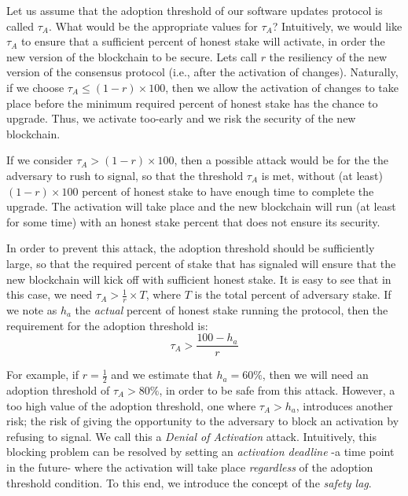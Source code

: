 Let us assume that the adoption threshold of our software updates protocol is called $\tau_A$. %
What would be the appropriate values for $\tau_A$? Intuitively, we would like $\tau_A$ to ensure that a sufficient percent of honest stake will activate, in order the new version of the blockchain to be secure. Lets call $r$ the resiliency
 of the new version of the consensus protocol (i.e., after the activation of changes). Naturally, if we choose $\tau_A \leq (1-r)\times100$, then we allow the activation of changes to take place before the minimum required percent of honest stake has the chance to upgrade. Thus, we activate too-early and we risk the security of the new blockchain. 

If we consider $\tau_A > (1-r)\times100$, then a possible attack would be for the the adversary to rush to signal, so that the threshold $\tau_A$ is met, without (at least) $(1-r) \times 100$ percent of honest stake to have enough time to complete the upgrade. The activation will take place and the new blockchain will run (at least for some time) with an honest stake percent that does not ensure its security. 

In order to prevent this attack, the adoption threshold should be sufficiently large, so that the required percent of stake that has signaled will ensure that the new blockchain will kick off with sufficient honest stake. It is easy to see that in this case, we need $\tau_A > \frac{1}{r} \times T$, where $T$ is the total percent of adversary stake. If we note as $h_a$ the \emph{actual} percent of honest stake running the protocol, then the requirement for the adoption threshold is:
\begin{equation} \label{tauA}
\tau_A > \frac{100 - h_a}{r}
\end{equation}

For example, if $r = \frac{1}{2}$ and we estimate that $h_a = 60\%$, then we will need an adoption threshold of $\tau_A > 80\% $, in order to be safe from this attack. However, a too high value of the adoption threshold, one where $\tau_A > h_a$, introduces another risk; the risk of  giving the opportunity to the adversary to block an activation by refusing to signal. We call this a \emph{Denial of Activation} attack. Intuitively, this blocking problem can be resolved by setting an \emph{activation deadline} -a time point in the future- where the activation will take place \emph{regardless} of the adoption threshold condition. To this end, we introduce the concept of the \emph{safety lag}.

